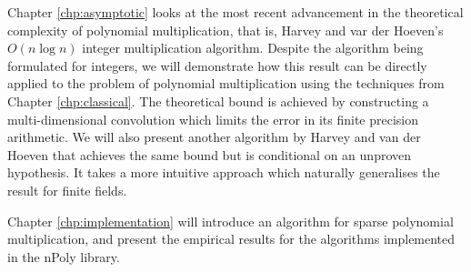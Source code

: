 Chapter \ref{chp:asymptotic} looks at the most recent advancement in the theoretical complexity of polynomial multiplication, that is, Harvey and var der Hoeven's $O(n \log n)$ integer multiplication algorithm. Despite the algorithm \cite{nlogn} being formulated for integers, we will demonstrate how this result can be directly applied to the problem of polynomial multiplication using the techniques from Chapter \ref{chp:classical}. The theoretical bound is achieved by constructing a multi-dimensional convolution which limits the error in its finite precision arithmetic. We will also present another algorithm by Harvey and van der Hoeven that achieves the same bound but is conditional on an unproven hypothesis. It takes a more intuitive approach which naturally generalises the result for finite fields.

Chapter \ref{chp:implementation} will introduce an algorithm for sparse polynomial multiplication, and present the empirical results for the algorithms implemented in the nPoly library.
